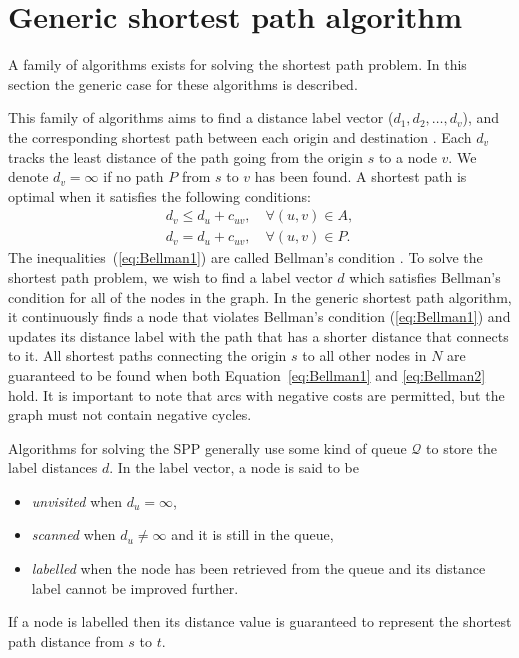 \section{Generic shortest path algorithm}
A family of algorithms exists for solving the shortest path problem.
In this section the generic case for these algorithms is described.

This family of algorithms aims to find a 
distance label vector ($d_1, d_2,\dots, d_v$),
and the corresponding shortest path between each origin and destination \citep{Klunder}.
Each $d_v$ tracks the least distance of the path going from the origin $s$ to a node $v$.
We denote $d_v = \infty$ if no path $P$ from $s$ to $v$ has been found.
A shortest path is optimal when it satisfies the following conditions:
\begin{align}
    d_v \leq d_u + c_{uv}, \quad \forall(u,v) \in A, \label{eq:Bellman1}\\
    d_v  =   d_u + c_{uv}, \quad \forall(u,v) \in P. \label{eq:Bellman2}
\end{align}
The inequalities~(\ref{eq:Bellman1}) are called Bellman's condition \citep{Bellman}.
To solve the shortest path problem,
we wish to find a label vector $d$ which satisfies Bellman's condition for all of the nodes in the graph.
In the generic shortest path algorithm,
it continuously finds a node that violates Bellman's condition (\ref{eq:Bellman1}) and updates its distance label with the path that has a shorter distance that connects to it.
All shortest paths connecting the origin $s$ to all other nodes in $N$ are guaranteed to be found when both Equation~\eqref{eq:Bellman1} and \eqref{eq:Bellman2} hold.
It is important to note that arcs with negative costs are permitted,
but the graph must not contain negative cycles.

Algorithms for solving the SPP generally use some kind of queue $\mathcal{Q}$ to store the label distances $d$.
In the label vector,
a node is said to be 
\begin{itemize}
    \item \emph{unvisited} when $d_u = \infty$,
    \item \emph{scanned} when $d_u \neq \infty$ and it is still in the queue,
    \item \emph{labelled} when the node has been retrieved from the queue and its distance label cannot be improved further.
\end{itemize}
If a node is labelled then its distance value is guaranteed to represent the shortest path distance from $s$ to $t$.

